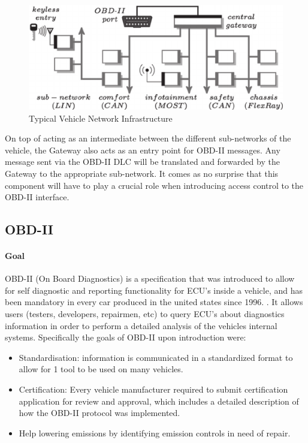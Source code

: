 \documentclass[11pt]{article}
\begin{document}
\begin{figure}[h]
	\label{fig:gateway}
	\centering
	\includegraphics[width=\textwidth]{gateway.png}
	\caption{Typical Vehicle Network Infrastructure \cite{Petit}}
\end{figure}

On top of acting as an intermediate between the different sub-networks of the vehicle, the Gateway also acts as an entry point for OBD-II messages. Any message sent via the OBD-II DLC will be translated and forwarded by the Gateway to the appropriate sub-network. It comes as no surprise that this component will have to play a crucial role when introducing access control to the OBD-II interface.

\subsection{OBD-II}
\label{sec:obd}

\paragraph{Goal} OBD-II (On Board Diagnostics) is a specification that was introduced to allow for self diagnostic and reporting functionality for ECU's inside a vehicle, and has been mandatory in every car produced in the united states since 1996. \cite{ODBwiki}. It allows users (testers, developers, repairmen, etc) to query ECU's about diagnostics information in order to perform a detailed analysis of the vehicles internal systems. Specifically the goals of OBD-II upon introduction were: 
\begin{itemize}
	\item Standardisation: information is communicated in a standardized format to allow for 1 tool to be used on many vehicles.
	\item Certification: Every vehicle manufacturer required to submit certification application for review and approval, which includes a detailed description of how the OBD-II protocol was implemented.
	\item Help lowering emissions by identifying emission controls in need of repair.
\end{itemize} 
\end{document}
